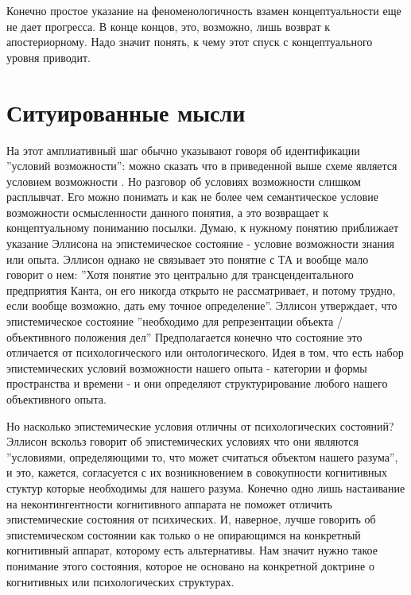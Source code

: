 \documentclass{article}
\begin{document}
Конечно простое указание на феноменологичность взамен концептуальности еще не дает прогресса. В конце концов, это, возможно, лишь возврат к апостериорному. Надо значит понять, к чему этот спуск с концептуального уровня приводит.

\section{Ситуированные мысли}

На этот амплиативный шаг обычно указывают говоря об идентификации ''условий возможности'': можно сказать что в приведенной выше схеме  является условием возможности . Но разговор об условиях возможности слишком расплывчат. Его можно понимать и как не более чем семантическое условие возможности осмысленности данного понятия, а это возвращает к концептуальному пониманию посылки. Думаю, к нужному понятию приближает указание Эллисона на эпистемическое состояние - условие возможности знания или опыта. Эллисон однако не связывает это понятие с ТА и вообще мало говорит о нем: ''Хотя понятие это центрально для трансцендентального предприятия Канта, он его никогда открыто не рассматривает, и потому трудно, если вообще возможно, дать ему точное определение''. Эллисон утверждает, что эпистемическое состояние ''необходимо для репрезентации объекта / объективного положения дел'' Предполагается конечно что состояние это отличается от психологического или онтологического. Идея в том, что есть набор эпистемических условий возможности нашего опыта - категории и формы пространства и времени - и они определяют структурирование любого нашего объективного опыта.

Но насколько эпистемические условия отличны от психологических состояний? Эллисон вскольз говорит об эпистемических условиях что они являются ''условиями, определяющими то, что может считаться объектом нашего разума'', и это, кажется, согласуется с их возникновением в совокупности когнитивных стуктур которые необходимы для нашего разума. Конечно одно лишь настаивание на неконтингентности когнитивного аппарата не поможет отличить эпистемические состояния от психических. И, наверное, лучше говорить об эпистемическом состоянии как только о не опирающимся на конкретный когнитивный аппарат, которому есть альтернативы. Нам значит нужно такое понимание этого состояния, которое не основано на конкретной доктрине о когнитивных или психологических структурах.
\end{document}
